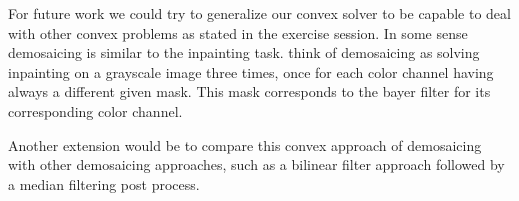\documentclass{paper}
\begin{document}
For future work we could try to generalize our convex solver to be capable to deal with other convex problems as stated in the exercise session. In some sense demosaicing is similar to the inpainting task. think of demosaicing as solving inpainting on a grayscale image three times, once for each color channel having always a different given mask. This mask corresponds to the bayer filter for its corresponding color channel. 

Another extension would be to compare this convex approach of demosaicing with other demosaicing approaches, such as a bilinear filter approach followed by a median filtering post process.
\end{document}

